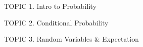 \documentclass[handout]{mcs}
\begin{document}
\renewcommand{\reading}
{Chapter~\bref{probability_chap}{Intro to Probability};
Chapter~\bref{ran_var_chap}{Random Variables}
}


\begin{staffnotes}
TOPIC 1.  Intro to Probability

TOPIC 2.  Conditional Probability

TOPIC 3.  Random Variables \& Expectation
\end{staffnotes}

\end{document}
